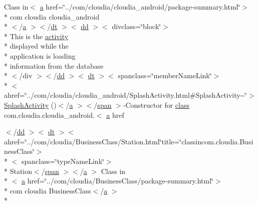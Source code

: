 \begin{DoxyCompactItemize}
 Class in$<$ \hyperlink{style_8css_a5e8981582017bb8b84c21f148345d1f7}{a} href=\char`\"{}../com/cloudia/cloudia\-\_\-android/package-\/summary.\-html\char`\"{}$>$\\*
 com cloudia cloudia\-\_\-android\\*
$<$/\hyperlink{style_8css_a5e8981582017bb8b84c21f148345d1f7}{a} $>$$<$/\hyperlink{stylesheet_8css_a107565fb4039d33b041380d6e0ea1d80}{dt} $>$$<$ \hyperlink{stylesheet_8css_a47f4718a86835a7771ec592ece845221}{dd} $>$$<$ divclass=\char`\"{}block\char`\"{}$>$\\*
 This is the \hyperlink{_sensor_activity_8html_a27ce96cb0fb53311961cb30579c7f77e}{activity} \\*
displayed while the \\*
application is loading \\*
information from the database\\*
$<$/div $>$$<$/\hyperlink{stylesheet_8css_a47f4718a86835a7771ec592ece845221}{dd} $>$$<$ \hyperlink{stylesheet_8css_a107565fb4039d33b041380d6e0ea1d80}{dt} $>$$<$ spanclass=\char`\"{}member\-Name\-Link\char`\"{}$>$\\*
$<$ ahref=\char`\"{}../com/cloudia/cloudia\-\_\-android/Splash\-Activity.\-html\#Splash\-Activity-\/-\/\char`\"{}$>$ \hyperlink{index-17_8html_abf40e6dde0f071bc2a82cb9e62cab757}{Splash\-Activity} ()$<$/\hyperlink{style_8css_a5e8981582017bb8b84c21f148345d1f7}{a} $>$$<$/\hyperlink{stylesheet_8css_a8343996ebcf16220b04e54659aac31cc}{span} $>$-\/Constructor for \hyperlink{_tools_8html_acf06f836132665ba8114f5a414c2403f}{class} com.\-cloudia.\-cloudia\-\_\-android.$<$ \hyperlink{style_8css_a5e8981582017bb8b84c21f148345d1f7}{a} href
\item 
$<$/\hyperlink{stylesheet_8css_a47f4718a86835a7771ec592ece845221}{dd} $>$$<$ \hyperlink{stylesheet_8css_a107565fb4039d33b041380d6e0ea1d80}{dt} $>$$<$ ahref=\char`\"{}../com/cloudia/Business\-Class/Station.\-html\char`\"{}title=\char`\"{}classincom.\-cloudia.\-Business\-Class\char`\"{}$>$\\*
$<$ spanclass=\char`\"{}type\-Name\-Link\char`\"{}$>$\\*
 Station$<$/\hyperlink{stylesheet_8css_a8343996ebcf16220b04e54659aac31cc}{span} $>$$<$/\hyperlink{style_8css_a5e8981582017bb8b84c21f148345d1f7}{a} $>$ Class in\\*
$<$ \hyperlink{style_8css_a5e8981582017bb8b84c21f148345d1f7}{a} href=\char`\"{}../com/cloudia/Business\-Class/package-\/summary.\-html\char`\"{}$>$\\*
 com cloudia Business\-Class$<$/\hyperlink{style_8css_a5e8981582017bb8b84c21f148345d1f7}{a} $>$\\*

\end{DoxyCompactItemize}
